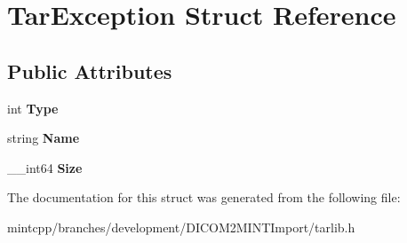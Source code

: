 \hypertarget{struct_tar_exception}{
\section{TarException Struct Reference}
\label{struct_tar_exception}
}
\subsection*{Public Attributes}
\begin{DoxyCompactItemize}
\item 
\hypertarget{struct_tar_exception_a200b1d4cac07171c4ad80488623afe18}{
int {\bfseries Type}}
\label{struct_tar_exception_a200b1d4cac07171c4ad80488623afe18}

\item 
\hypertarget{struct_tar_exception_ad36fb6667b2d6e11ebeea9d8eacd8043}{
string {\bfseries Name}}
\label{struct_tar_exception_ad36fb6667b2d6e11ebeea9d8eacd8043}

\item 
\hypertarget{struct_tar_exception_af4c595fb1789f67c20cf805ea96799d9}{
\_\-\_\-int64 {\bfseries Size}}
\label{struct_tar_exception_af4c595fb1789f67c20cf805ea96799d9}

\end{DoxyCompactItemize}


The documentation for this struct was generated from the following file:\begin{DoxyCompactItemize}
\item 
mintcpp/branches/development/DICOM2MINTImport/tarlib.h\end{DoxyCompactItemize}

